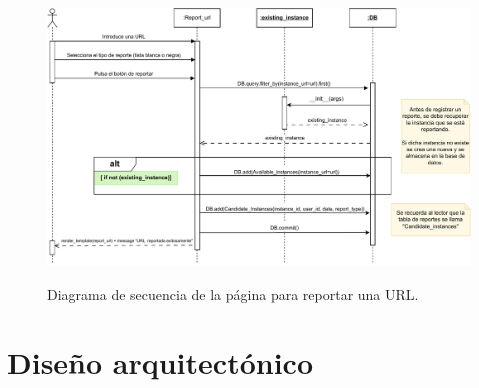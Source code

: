 \begin{itemize}
	\begin{figure}[h]
		\caption[Diagrama: secuencia (reportar url)]{Diagrama de secuencia de la página para reportar una URL.}
		\centering
		\includegraphics[scale=0.4]{../img/anexos/diagrams/sequence-report_url}
		\label{c:diagrama-seq-report_url}
	\end{figure}


\end{itemize}

\section{Diseño arquitectónico}
\label{s:diseño-arquitectonico}

